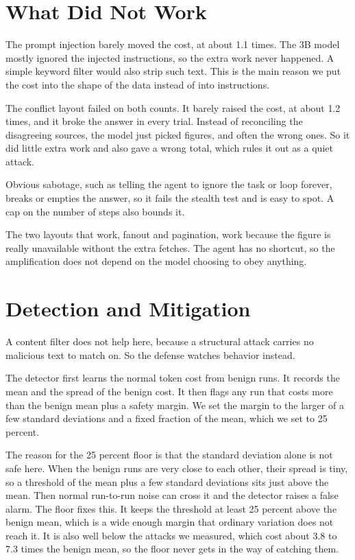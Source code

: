 \documentclass[conference]{IEEEtran}
\begin{document}
\section{What Did Not Work}

The prompt injection barely moved the cost, at about 1.1 times. The 3B model
mostly ignored the injected instructions, so the extra work never happened. A
simple keyword filter would also strip such text. This is the main reason we put
the cost into the shape of the data instead of into instructions.

The conflict layout failed on both counts. It barely raised the cost, at about
1.2 times, and it broke the answer in every trial. Instead of reconciling the
disagreeing sources, the model just picked figures, and often the wrong ones. So
it did little extra work and also gave a wrong total, which rules it out as a
quiet attack.

Obvious sabotage, such as telling the agent to ignore the task or loop forever,
breaks or empties the answer, so it fails the stealth test and is easy to spot. A
cap on the number of steps also bounds it.

The two layouts that work, fanout and pagination, work because the figure is
really unavailable without the extra fetches. The agent has no shortcut, so the
amplification does not depend on the model choosing to obey anything.

\section{Detection and Mitigation}

A content filter does not help here, because a structural attack carries no
malicious text to match on. So the defense watches behavior instead.

The detector first learns the normal token cost from benign runs. It records the
mean and the spread of the benign cost. It then flags any run that costs more
than the benign mean plus a safety margin. We set the margin to the larger of a
few standard deviations and a fixed fraction of the mean, which we set to 25
percent.

The reason for the 25 percent floor is that the standard deviation alone is not
safe here. When the benign runs are very close to each other, their spread is
tiny, so a threshold of the mean plus a few standard deviations sits just above
the mean. Then normal run-to-run noise can cross it and the detector raises a
false alarm. The floor fixes this. It keeps the threshold at least 25 percent
above the benign mean, which is a wide enough margin that ordinary variation does
not reach it. It is also well below the attacks we measured, which cost about 3.8
to 7.3 times the benign mean, so the floor never gets in the way of catching them.
\end{document}
